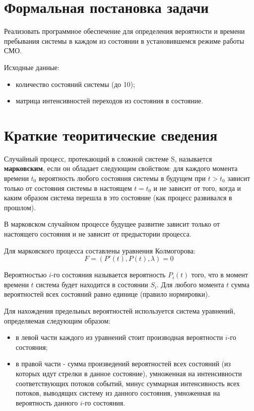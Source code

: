 \section*{Формальная постановка задачи}

Реализовать программное обеспечение для определения вероятности и времени пребывания системы в каждом из состоянии в установившемся режиме работы СМО.

Исходные данные:
\begin{itemize}
	\item количество состояний системы (до 10);
	\item матрица интенсивностей переходов из состояния в состояние.
\end{itemize}

\section*{Краткие теоритические сведения}

Случайный процесс, протекающий в сложной системе S, называется \textbf{марковским}, если он обладает следующим свойством: для каждого момента времени $t_0$ вероятность любого состояния системы в будущем при $t>t_0$ зависит только от состояния системы в настоящем $t=t_0$ и не зависит от того, когда и каким образом система перешла в это состояние (как процесс развивался в прошлом).

В марковском случайном процессе будущее развитие зависит только от настоящего состояния и не зависит от предыстории процесса.

Для марковского процесса составлены уравнения Колмогорова:
\begin{equation*}
	F = (P'(t), P(t), \lambda) = 0
\end{equation*}

Вероятностью $i$-го состояния называется вероятность $P_i(t)$ того, что в момент времени $t$ система будет находится в состоянии $S_i$. Для любого момента $t$ сумма вероятностей всех состояний равно единице (правило нормировки).

Для нахождения предельных вероятностей используется система уравнений, определяемая следующим образом:
\begin{itemize}
	\item в левой части каждого из уравнений стоит производная вероятности $i$-го состояния;
	\item в	правой части - сумма произведений вероятностей всех состояний (из которых идут стрелки в	данное состояние), умноженная на интенсивности соответствующих потоков событий, минус суммарная интенсивность всех потоков, выводящих систему из данного состояния, умноженная на вероятность данного $i$-го состояния.
\end{itemize} 

